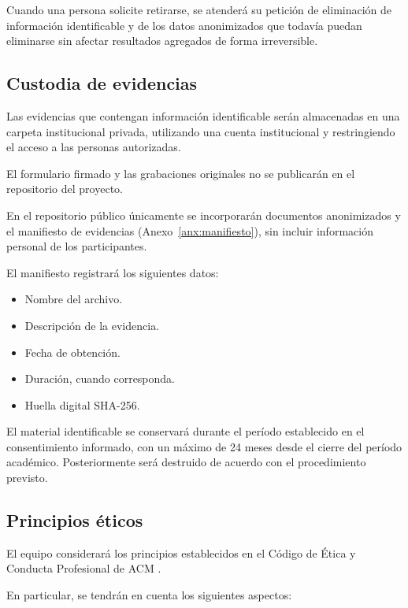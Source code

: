 \documentclass[11pt,a4paper]{article}
\begin{document}
	Cuando una persona solicite retirarse, se atenderá su petición de eliminación de información identificable y de los datos anonimizados que todavía puedan eliminarse sin afectar resultados agregados de forma irreversible.
	
	\subsection{Custodia de evidencias}
	
	Las evidencias que contengan información identificable serán almacenadas en una carpeta institucional privada, utilizando una cuenta institucional y restringiendo el acceso a las personas autorizadas.
	
	El formulario firmado y las grabaciones originales no se publicarán en el repositorio del proyecto.
	
	En el repositorio público únicamente se incorporarán documentos anonimizados y el manifiesto de evidencias (Anexo~\ref{anx:manifiesto}), sin incluir información personal de los participantes.
	
	El manifiesto registrará los siguientes datos:
	
	\begin{itemize}
		\item Nombre del archivo.
		\item Descripción de la evidencia.
		\item Fecha de obtención.
		\item Duración, cuando corresponda.
		\item Huella digital SHA-256.
	\end{itemize}
	
	El material identificable se conservará durante el período establecido en el consentimiento informado, con un máximo de 24 meses desde el cierre del período académico. Posteriormente será destruido de acuerdo con el procedimiento previsto.
	
	\subsection{Principios éticos}
	
	El equipo considerará los principios establecidos en el Código de Ética y Conducta Profesional de ACM \cite{acm2018}.
	
	En particular, se tendrán en cuenta los siguientes aspectos:
	
\end{document}
